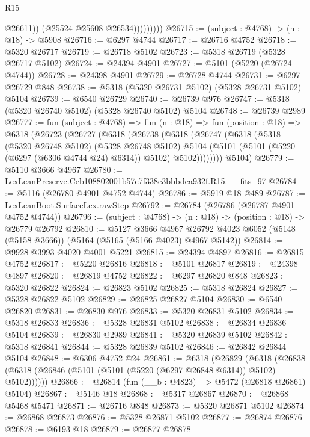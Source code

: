 \begin{lexlean}{R15}
\begin{coremodule}
{{{{{{{{{{{                        @26611))
                    (@25524 @25608 @26534)))))))))
@26715 := (subject : @4768) -> (n : @18) -> @5908
@26716 := @6297 @4744
@26717 := @26716 @4752
@26718 := @5320 @26717
@26719 := @26718 @5102
@26723 := @5318 @26719 (@5328 @26717 @5102)
@26724 := @24394 @4901
@26727 := @5101 (@5220 (@26724 @4744))
@26728 := @24398 @4901
@26729 := @26728 @4744
@26731 := @6297 @26729 @848
@26738 := @5318 (@5320 @26731 @5102) (@5328 @26731 @5102) @5104
@26739 := @6540 @26729
@26740 := @26739 @976
@26747 := @5318 (@5320 @26740 @5102) (@5328 @26740 @5102) @5104
@26748 := @26739 @2989
@26777 := fun (subject : @4768) =>
  fun (n : @18) =>
  fun (position : @18) =>
  @6318
    (@26723
      (@26727
        (@6318
          (@26738
            (@6318
              (@26747
                (@6318
                  (@5318
                    (@5320 @26748 @5102)
                    (@5328 @26748 @5102)
                    @5104
                    (@5101 (@5101 (@5220 (@6297 (@6306 @4744 @24) @6314)) @5102) @5102))))))))
      @5104)
@26779 := @5110 @3666 @4967
@26780 := LexLeanPreserve.Ceb108802001b57e7f338e3bbbdea932f.R15.__fits_97
@26784 := @5116 (@26780 @4901 @4752 @4744)
@26786 := @5919 @18 @489
@26787 := LexLeanBoot.SurfaceLex.rawStep
@26792 := @26784 (@26786 (@26787 @4901 @4752 @4744))
@26796 := (subject : @4768) -> (n : @18) -> (position : @18) -> @26779 @26792
@26810 := @5127
    @3666
    @4967
    @26792
    @4023
    @6052
    (@5148 (@5158 @3666))
    (@5164 (@5165 (@5166 @4023) @4967 @5142))
@26814 := @9928 @3993 @4020 @4001 @5221
@26815 := @24394 @4897
@26816 := @26815 @4752
@26817 := @5220 @26816
@26818 := @5101 @26817
@26819 := @24398 @4897
@26820 := @26819 @4752
@26822 := @6297 @26820 @848
@26823 := @5320 @26822
@26824 := @26823 @5102
@26825 := @5318 @26824
@26827 := @5328 @26822 @5102
@26829 := @26825 @26827 @5104
@26830 := @6540 @26820
@26831 := @26830 @976
@26833 := @5320 @26831 @5102
@26834 := @5318 @26833
@26836 := @5328 @26831 @5102
@26838 := @26834 @26836 @5104
@26839 := @26830 @2989
@26841 := @5320 @26839 @5102
@26842 := @5318 @26841
@26844 := @5328 @26839 @5102
@26846 := @26842 @26844 @5104
@26848 := @6306 @4752 @24
@26861 := @6318
    (@26829
      (@6318 (@26838 (@6318 (@26846 (@5101 (@5101 (@5220 (@6297 @26848 @6314)) @5102) @5102))))))
@26866 := @26814 (fun (__b : @4823) => @5472 (@26818 @26861) @5104)
@26867 := @5146 @18
@26868 := @5317 @26867
@26870 := @26868 @5468 @5471
@26871 := @26716 @848
@26873 := @5320 @26871 @5102
@26874 := @26868 @26873
@26876 := @5328 @26871 @5102
@26877 := @26874 @26876
@26878 := @6193 @18
@26879 := @26877 @26878
}}}}}}}}}}}
\end{coremodule}
\end{lexlean}
